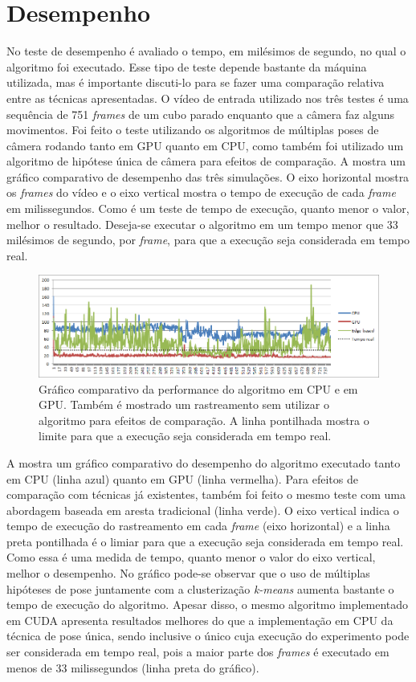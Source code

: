 \section{Desempenho}

No teste de desempenho é avaliado o tempo, em milésimos de segundo, no qual o algoritmo foi executado. Esse tipo de teste depende bastante da máquina utilizada, mas é importante discuti-lo para se fazer uma comparação relativa entre as técnicas apresentadas. O vídeo de entrada utilizado nos três testes é uma sequência de 751 \emph{frames} de um cubo parado enquanto que a câmera faz alguns movimentos. Foi feito o teste utilizando os algoritmos de múltiplas poses de câmera rodando tanto em GPU quanto em CPU, como também foi utilizado um algoritmo de hipótese única de câmera para efeitos de comparação. A  mostra um gráfico comparativo de desempenho das três simulações. O eixo horizontal mostra os \emph{frames} do vídeo e o eixo vertical mostra o tempo de execução de cada \emph{frame} em milissegundos. Como é um teste de tempo de execução, quanto menor o valor, melhor o resultado. Deseja-se executar o algoritmo em um tempo menor que 33 milésimos de segundo, por \emph{frame}, para que a execução seja considerada em tempo real.

\begin{figure}[!ht]
\centering\includegraphics[width=\textwidth]{monografia/performance}
\caption{Gráfico comparativo da performance do algoritmo em CPU e em GPU. Também é mostrado um rastreamento sem utilizar o algoritmo para efeitos de comparação. A linha pontilhada mostra o limite para que a execução seja considerada em tempo real.}
\label{performance}
\end{figure}

A  mostra um gráfico comparativo do desempenho do algoritmo executado tanto em CPU (linha azul) quanto em GPU (linha vermelha). Para efeitos de comparação com técnicas já existentes, também foi feito o mesmo teste com uma abordagem baseada em aresta tradicional (linha verde). O eixo vertical indica o tempo de execução do rastreamento em cada \emph{frame} (eixo horizontal) e a linha preta pontilhada é o limiar para que a execução seja considerada em tempo real. Como essa é uma medida de tempo, quanto menor o valor do eixo vertical, melhor o desempenho. No gráfico pode-se observar que o uso de múltiplas hipóteses de pose juntamente com a clusterização \emph{k-means} aumenta bastante o tempo de execução do algoritmo. Apesar disso, o mesmo algoritmo implementado em CUDA apresenta resultados melhores do que a implementação em CPU da técnica de pose única, sendo inclusive o único cuja execução do experimento pode ser considerada em tempo real, pois a maior parte dos \emph{frames} é executado em menos de 33 milissegundos (linha preta do gráfico).
